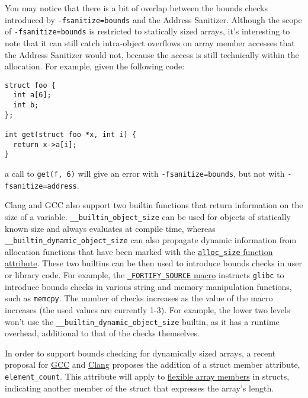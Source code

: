 \documentclass[a4paper,]{report}
\begin{document}
You may notice that there is a bit of overlap between the bounds checks
introduced by \texttt{-fsanitize=bounds} and the Address Sanitizer.
Although the scope of \texttt{-fsanitize=bounds} is restricted to
statically sized arrays, it's interesting to note that it can still
catch intra-object overflows on array
member accesses that the Address Sanitizer would not, because the access
is still technically within the allocation. For example, given the
following code:

\begin{verbatim}
struct foo {
  int a[6];
  int b;
};

int get(struct foo *x, int i) {
  return x->a[i];
}
\end{verbatim}

a call to \texttt{get(f,\ 6)} will give an error with
\texttt{-fsanitize=bounds}, but not with \texttt{-fsanitize=address}.

Clang and GCC also support two builtin functions that return information
on the size of a variable. \texttt{\_\_builtin\_object\_size} can be
used for objects of statically known size and always evaluates at
compile time, whereas \texttt{\_\_builtin\_dynamic\_object\_size} can
also propagate dynamic information from allocation functions that have
been marked with the
\href{https://gcc.gnu.org/onlinedocs/gcc-4.7.2/gcc/Function-Attributes.html}{\texttt{alloc\_size}
function attribute}. These two builtins can be then used to introduce
bounds checks in user or library code. For example, the
\href{https://man7.org/linux/man-pages/man7/feature_test_macros.7.html}{\texttt{\_FORTIFY\_SOURCE}
macro} instructs \texttt{glibc} to introduce bounds checks in various
string and memory manipulation functions, such as \texttt{memcpy}. The
number of checks increases as the value of the macro increases (the used
values are currently 1-3). For example, the lower two levels won't use
the \texttt{\_\_builtin\_dynamic\_object\_size} builtin, as it has a
runtime overhead, additional to that of the checks themselves.

In order to support bounds checking for dynamically sized arrays, a
recent proposal for
\href{https://gcc.gnu.org/bugzilla/show_bug.cgi?id=108896}{GCC} and
\href{https://reviews.llvm.org/D148381}{Clang} proposes the addition of
a struct member attribute, \texttt{element\_count}. This attribute will
apply to
\href{https://en.wikipedia.org/wiki/Flexible_array_member}{flexible
array members} in structs, indicating another member of the struct that
expresses the array's length.
\end{document}
